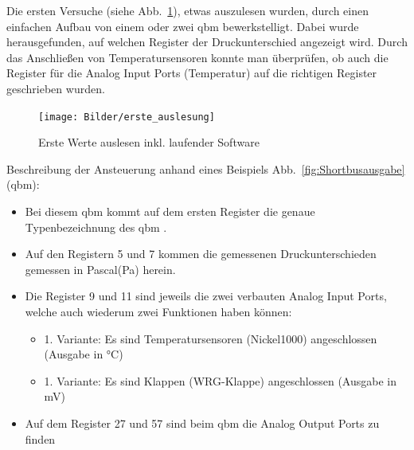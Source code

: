 Die ersten Versuche (siehe  Abb.~\ref{fig:ersteauslesung}), etwas auszulesen wurden, durch einen einfachen Aufbau von einem oder zwei \gls{qbm}  bewerkstelligt. Dabei wurde herausgefunden, auf welchen Register der Druckunterschied angezeigt wird. Durch das Anschließen von Temperatursensoren konnte man überprüfen, ob auch die Register für die Analog Input Ports (Temperatur) auf die richtigen Register geschrieben wurden.

\begin{figure}[H]
	\centering
	\texttt{[image: Bilder/erste\_auslesung]}
	\caption{Erste Werte auslesen inkl. laufender Software} 
	\label{fig:ersteauslesung}
\end{figure}

Beschreibung der Ansteuerung anhand eines Beispiels Abb.~\ref{fig:Shortbusausgabe} (\gls{qbm}):
\begin{itemize}
	\item Bei diesem \gls{qbm}  kommt auf dem ersten Register die genaue Typenbezeichnung des \gls{qbm} .  
	\item Auf den Registern 5 und 7 kommen die gemessenen Druckunterschieden gemessen in Pascal(Pa) herein. 
	\item Die Register 9 und 11 sind jeweils die zwei verbauten Analog Input Ports, welche auch wiederum zwei Funktionen haben können:
	\begin{itemize}
		\item 1. Variante: Es sind Temperatursensoren (\zB Nickel1000) angeschlossen (Ausgabe in °C)
		\item 1. Variante: Es sind Klappen (\zB WRG-Klappe) angeschlossen (Ausgabe in mV)
	\end{itemize}
	\item Auf dem Register 27 und 57 sind beim \gls{qbm} die Analog Output Ports zu finden
	
	\cite[vgl.][]{siemens:2021}
\end{itemize} 
 